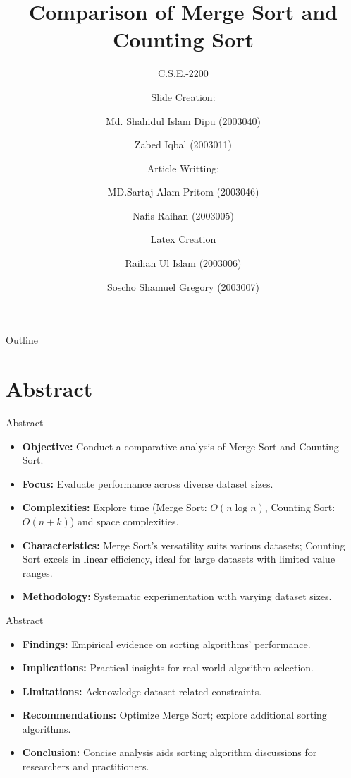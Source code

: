 \documentclass{beamer}
\title{Comparison of Merge Sort and Counting Sort}
\subtitle{C.S.E.-2200}
\author[Md. Shahidul Islam Dipu \and Zabed Iqbal]{Slide Creation:\newline\and  Md. Shahidul Islam Dipu (2003040) \newline\and Zabed Iqbal (2003011)\newline \newline\and Article Writting:\newline\and
MD.Sartaj Alam Pritom (2003046) \newline\and Nafis Raihan (2003005)
\newline\and \newline Latex Creation \newline\and Raihan Ul Islam (2003006)
\newline\and Soscho Shamuel Gregory (2003007)\newline}
\begin{document}
	
	\begin{frame}
		\titlepage
	\end{frame}
	
	\begin{frame}{Outline}
		\tableofcontents
	\end{frame}
	
	\section{Abstract}
	
	\begin{frame}{Abstract}
		\begin{itemize}
			\item \textbf{Objective:} Conduct a comparative analysis of Merge Sort and Counting Sort.
			
			\item \textbf{Focus:} Evaluate performance across diverse dataset sizes.
			
			\item \textbf{Complexities:} Explore time (Merge Sort: $O(n \log n)$, Counting Sort: $O(n + k)$) and space complexities.
			
			\item \textbf{Characteristics:} Merge Sort's versatility suits various datasets; Counting Sort excels in linear efficiency, ideal for large datasets with limited value ranges.
			
			\item \textbf{Methodology:} Systematic experimentation with varying dataset sizes.\cite{researchgate}
		\end{itemize}
	\end{frame}
	
	\begin{frame}{Abstract}
		\begin{itemize}
			\item \textbf{Findings:} Empirical evidence on sorting algorithms' performance.
			
			\item \textbf{Implications:} Practical insights for real-world algorithm selection.
			
			\item \textbf{Limitations:} Acknowledge dataset-related constraints.
			
			\item \textbf{Recommendations:} Optimize Merge Sort; explore additional sorting algorithms.
			
			\item \textbf{Conclusion:} Concise analysis aids sorting algorithm discussions for researchers and practitioners.
		\end{itemize}
	\end{frame}
	
\end{document}

